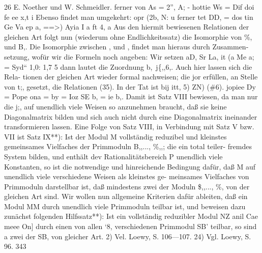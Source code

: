 \documentclass[11pt,a4paper]{article}
\theoremstyle{plain}
\theoremstyle{definition}
\begin{document}
26 
E. Noether und W. Schmeidler. 
ferner 
von As = 
2'', A; - hottie Ws = Dif doi fe ee 
x,t 
i 
Ebenso findet man umgekehrt: 
opr (2b, 
N: 
u 
ferner 
tet 
DD, = 
dos tin Ge Va ep a, ==>) Ayia I 
a ft 
4, a 
Aus den hiermit bewiesenen Relationen der gleichen Art folgt nun 
(wiederum ohne Endlichkeitssatz) 
die Isomorphie 
von \%, und B,. 
Die 
Isomorphie zwischen , und , findet 
man 
hieraus durch Zusammen- 
setzung, wofür wir die Formeln noch angeben: Wir setzen 
aD, Sr La, it (a  Me a; = Syd`` 1,0: 
1,7 
5 
dann lautet die Zuordnung b,~j\{,,6,. 
Auch hier lassen 
sich die Rela- 
tionen der gleichen Art wieder 
formal 
nachweisen; 
die jor erfüllen, 
an 
Stelle von t;, gesetzt, die Relationen (35). 
In der Tat ist 
bij 
itt, 5) ZN) 
(\#6). 
jopiee Dy = Pope ona 
= by = Ioz SE b, = ie b,. 
Damit ist Satz VIII bewiesen, 
da man 
nur die j;, auf unendlich 
viele 
Weisen so anzunehmen braucht, daß sie keine Diagonalmatrix bilden und 
sich auch nicht durch eine Diagonalmatrix ineinander transformieren lassen. 
Eine Folge von Satz VIII, 
in Verbindung mit Satz V bzw. VII ist 
Satz IX**): Ist der Modul 
M vollständig reduzibel und kleinstes 
gemeinsames Vielfaches der Primmoduln B,,..., \%,,; die ein total teiler- 
fremdes System bilden, und enthält dev Rationalitätsbereich P unendlich 
viele Konstanten, 
so 
ist 
die notwendige und hinreichende Bedingung 
dafür, daß M auf unendlich viele verschiedene Weisen als kleinstes ge- 
meinsames 
Vielfaches von Primmoduln 
darstellbar 
ist, daß mindestens 
zwei der Moduln \$,,..., \%, von der gleichen Art sind. 
Wir wollen nun allgemeine Kriterien dafür ableiten, daß ein Modul 
MM durch 
unendlich 
viele Primmoduln 
teilbar 
ist, und beweisen 
dazu 
zunächst folgenden 
Hilfssatz**): Ist ein vollständig reduzibler Modul NZ 
anil Cae 
meee On] 
durch einen von allen `8, verschiedenen Primmodul SB' teilbar, so sind 
a zwei der SB, von gleicher Art. 
2) Vel. Loewy, S. 106---107. 
24) Vgl. Loewy, S. 96. 
343
\end{document}
